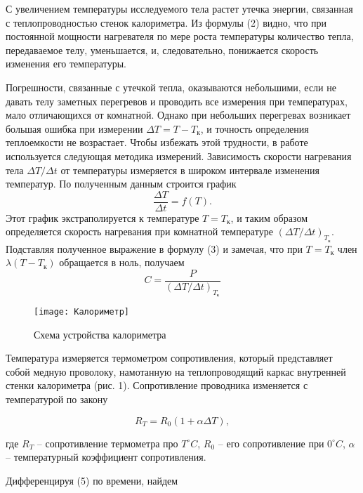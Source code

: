 \documentclass[12pt,a4paper]{article}
\begin{document}
	С увеличением температуры исследуемого тела растет утечка энергии, связанная с теплопроводностью стенок калориметра. Из формулы (2) видно, что при постоянной мощности нагревателя по мере роста температуры количество тепла, передаваемое телу, уменьшается, и, следовательно, понижается скорость изменения его температуры.
	
	Погрешности, связанные с утечкой тепла, оказываются небольшими, если не давать телу заметных перегревов и проводить все измерения при температурах, мало отличающихся от комнатной. Однако при небольших перегревах возникает большая ошибка при измерении $\Delta T = T - T_\text{к}$, и точность определения теплоемкости не возрастает. Чтобы избежать этой трудности, в работе используется следующая методика измерений. Зависимость скорости нагревания тела $\Delta T / \Delta t$ от температуры измеряется в широком интервале изменения температур. По полученным данным строится график
	\begin{equation*}
		\frac{\Delta T}{\Delta t} = f(T).
	\end{equation*}
	Этот график экстраполируется к температуре $T = T_{\text{к}}$, и таким образом определяется скорость нагревания при комнатной температуре $(\Delta T / \Delta t)_{T_{\text{к}}}$. Подставляя полученное выражение в формулу (3) и замечая, что при $T = T_{\text{к}}$ член $\lambda(T - T_{\text{к}})$ обращается в ноль, получаем
	\begin{equation}
		C = \frac{P}{(\Delta T / \Delta t)_{T_{\text{к}}}}
		\label{4}
	\end{equation}

	
\begin{figure}
	\centering
	\texttt{[image: Калориметр]}
	\caption{Схема устройства калориметра}
	\label{fig:}
\end{figure}
	
	Температура измеряется термометром сопротивления, который представляет собой медную проволоку, намотанную на теплопроводящий каркас внутренней стенки калориметра (рис. 1). Сопротивление проводника изменяется с температурой по закону
	
	\begin{equation}
		R_{T} = R_{0}(1 + \alpha \Delta T),
		\label{RT}
	\end{equation}
	
	где $R_{T}$ -- сопротивление термометра про $T  ^{\circ}C$, $R_{0}$ -- его сопротивление при $0  ^{\circ}C$, $\alpha$ -- температурный коэффициент сопротивления. 
	
	Дифференцируя (5) по времени, найдем
	
\end{document}
